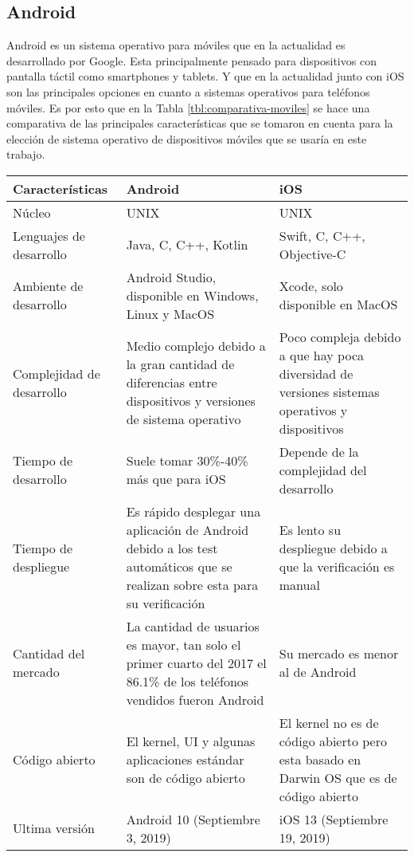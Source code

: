 \subsection{Android}
Android es un sistema operativo para móviles que en la actualidad es desarrollado por Google. Esta principalmente pensado para dispositivos con pantalla táctil como smartphones y tablets. Y que en la actualidad junto con iOS son las principales opciones en cuanto a sistemas operativos para teléfonos móviles. Es por esto que en la Tabla \ref{tbl:comparativa-moviles} se hace una comparativa de las principales características que se tomaron en cuenta para la elección de sistema operativo de dispositivos móviles que se usaría en este trabajo.
\begin{center}
    \begin{longtable}{|J{3cm}|J{5cm}|J{5cm}|}
    \hline
    \textbf{Características} & \textbf{Android} & \textbf{iOS} \\ \hline
    Núcleo & UNIX & UNIX \\ \hline
    Lenguajes de desarrollo & Java, C, C++, Kotlin & Swift, C, C++, Objective-C \\ \hline
    Ambiente de desarrollo & Android Studio, disponible en Windows, Linux y MacOS & Xcode, solo disponible en MacOS \\ \hline
    Complejidad de desarrollo & Medio complejo debido a la gran cantidad de diferencias entre dispositivos y versiones de sistema operativo & Poco compleja debido a que hay poca diversidad de versiones sistemas operativos y dispositivos \\ \hline
    Tiempo de desarrollo & Suele tomar 30\%-40\% más que para iOS \cite{ddi} & Depende de la complejidad del desarrollo \\ \hline
    Tiempo de despliegue & Es rápido desplegar una aplicación de Android debido a los test automáticos que se realizan sobre esta para su verificación & Es lento su despliegue debido a que la verificación es manual \\ \hline
    Cantidad del mercado & La cantidad de usuarios es mayor, tan solo el primer cuarto del 2017 el 86.1\% de los teléfonos vendidos fueron Android \cite{ddi} & Su mercado es menor al de Android \\ \hline
    Código abierto & El kernel, UI y algunas aplicaciones estándar son de código abierto & El kernel no es de código abierto pero esta basado en Darwin OS que es de código abierto \\ \hline
    Ultima versión & Android 10 (Septiembre 3, 2019) & iOS 13 (Septiembre 19, 2019) \\ \hline

\end{longtable}
\end{center}
